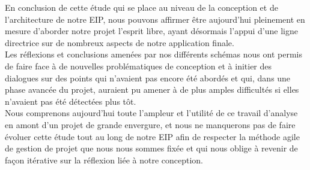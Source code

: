 \documentclass{life-fr}
\begin{document}
En conclusion de cette étude qui se place au niveau de la conception et de l'architecture de notre
EIP, nous pouvons affirmer être aujourd'hui pleinement en mesure d'aborder notre projet
l'esprit libre, ayant désormais l'appui d'une ligne directrice sur de nombreux
aspects de notre application finale.
\\
Les réflexions et conclusions amenées par nos différents schémas nous ont permis
de faire face à de nouvelles problématiques de conception et à initier des dialogues
sur des points qui n'avaient pas encore été abordés et qui, dans une phase avancée
du projet, auraient pu amener à de plus amples difficultés si elles n'avaient pas été
détectées plus tôt.
\\
Nous comprenons aujourd'hui toute l'ampleur et l'utilité de ce travail d'analyse en amont
d'un projet de grande envergure, et nous ne manquerons pas de faire évoluer cette
étude tout au long de notre EIP afin de respecter la méthode agile de gestion
de projet que nous nous sommes fixée et qui nous oblige à revenir de façon itérative
sur la réflexion liée à notre conception.

\end{document}
